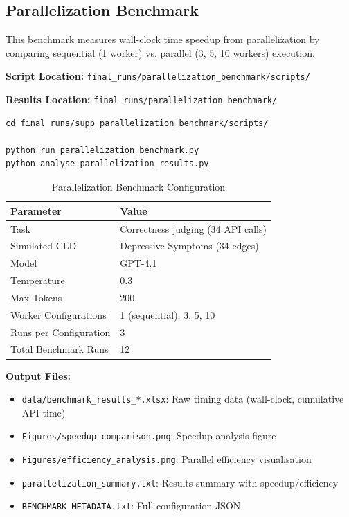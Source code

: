 \subsection{Parallelization Benchmark}

This benchmark measures wall-clock time speedup from parallelization by comparing sequential (1 worker) vs. parallel (3, 5, 10 workers) execution.

\textbf{Script Location:} \texttt{final\_runs/parallelization\_benchmark/scripts/}

\textbf{Results Location:} \texttt{final\_runs/parallelization\_benchmark/}

\begin{verbatim}
cd final_runs/supp_parallelization_benchmark/scripts/

python run_parallelization_benchmark.py
python analyse_parallelization_results.py
\end{verbatim}

\begin{table}[H]
\centering
\caption{Parallelization Benchmark Configuration}
\label{tab:parallel_benchmark_config}
\footnotesize
\begin{tabular}{@{}ll@{}}
\toprule
\textbf{Parameter} & \textbf{Value} \\
\midrule
Task & Correctness judging (34 API calls) \\
Simulated CLD & Depressive Symptoms (34 edges) \\
Model & GPT-4.1 \\
Temperature & 0.3 \\
Max Tokens & 200 \\
Worker Configurations & 1 (sequential), 3, 5, 10 \\
Runs per Configuration & 3 \\
Total Benchmark Runs & 12 \\
\bottomrule
\end{tabular}
\end{table}

\textbf{Output Files:}
\begin{itemize}[noitemsep]
    \item \texttt{data/benchmark\_results\_*.xlsx}: Raw timing data (wall-clock, cumulative API time)
    \item \texttt{Figures/speedup\_comparison.png}: Speedup analysis figure
    \item \texttt{Figures/efficiency\_analysis.png}: Parallel efficiency visualisation
    \item \texttt{parallelization\_summary.txt}: Results summary with speedup/efficiency
    \item \texttt{BENCHMARK\_METADATA.txt}: Full configuration JSON
\end{itemize}

